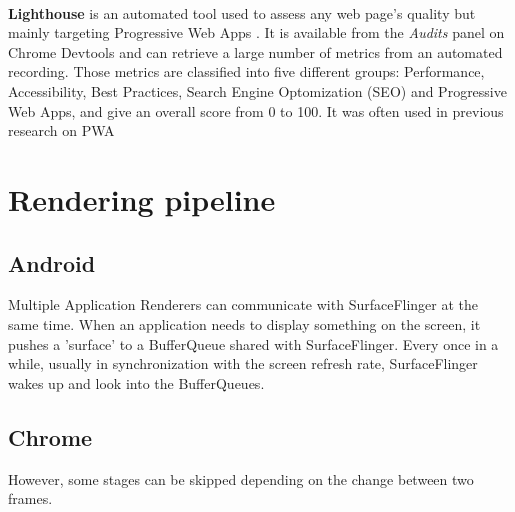 \paragraph{}
\textbf{Lighthouse} \cite{lighthouse} is an automated  tool used to assess any web page's quality but mainly targeting Progressive Web Apps \cite{PWApossibleUnifer}. It is available from the \textit{Audits} panel on Chrome Devtools and can retrieve a large number of metrics from an automated recording. Those metrics are classified into five different groups: Performance, Accessibility, Best Practices, Search Engine Optomization (SEO) and Progressive Web Apps, and give an overall score from 0 to 100. It was often used in previous research on PWA \cite{}

\section{Rendering pipeline}

\subsection{Android}
Multiple Application Renderers can communicate with SurfaceFlinger at the same time.   When an application needs to display something on the screen, it pushes a 'surface' to a BufferQueue shared with SurfaceFlinger. Every once in a while, usually in synchronization with the screen refresh rate, SurfaceFlinger wakes up and look into the BufferQueues.

\subsection{Chrome}
However, some stages can be skipped depending on the change between two frames.

